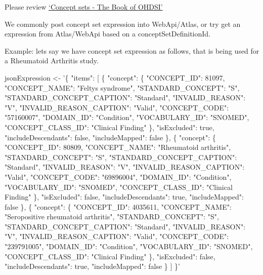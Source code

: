 \documentclass[
]{article}
\newenvironment{Shaded}{\begin{snugshade}}{\end{snugshade}}
\newcommand{\NormalTok}[1]{#1}
\newcommand{\StringTok}[1]{\textcolor[rgb]{0.31,0.60,0.02}{#1}}
\begin{document}
Please review
\href{https://ohdsi.github.io/TheBookOfOhdsi/Cohorts.html\#conceptSets}{`Concept
sets - The Book of OHDSI'}

We commonly post concept set expression into WebApi/Atlas, or try get an
expression from Atlas/WebApi based on a conceptSetDefinitionId.

Example: lets say we have concept set expression as follows, that is
being used for a Rheumatoid Arthritis study.

\begin{Shaded}
\begin{Highlighting}[]

\NormalTok{jsonExpression <-}\StringTok{ '\{}
\StringTok{  "items": [}
\StringTok{    \{}
\StringTok{      "concept": \{}
\StringTok{        "CONCEPT_ID": 81097,}
\StringTok{        "CONCEPT_NAME": "Feltys syndrome",}
\StringTok{        "STANDARD_CONCEPT": "S",}
\StringTok{        "STANDARD_CONCEPT_CAPTION": "Standard",}
\StringTok{        "INVALID_REASON": "V",}
\StringTok{        "INVALID_REASON_CAPTION": "Valid",}
\StringTok{        "CONCEPT_CODE": "57160007",}
\StringTok{        "DOMAIN_ID": "Condition",}
\StringTok{        "VOCABULARY_ID": "SNOMED",}
\StringTok{        "CONCEPT_CLASS_ID": "Clinical Finding"}
\StringTok{      \},}
\StringTok{      "isExcluded": true,}
\StringTok{      "includeDescendants": false,}
\StringTok{      "includeMapped": false}
\StringTok{    \},}
\StringTok{    \{}
\StringTok{      "concept": \{}
\StringTok{        "CONCEPT_ID": 80809,}
\StringTok{        "CONCEPT_NAME": "Rheumatoid arthritis",}
\StringTok{        "STANDARD_CONCEPT": "S",}
\StringTok{        "STANDARD_CONCEPT_CAPTION": "Standard",}
\StringTok{        "INVALID_REASON": "V",}
\StringTok{        "INVALID_REASON_CAPTION": "Valid",}
\StringTok{        "CONCEPT_CODE": "69896004",}
\StringTok{        "DOMAIN_ID": "Condition",}
\StringTok{        "VOCABULARY_ID": "SNOMED",}
\StringTok{        "CONCEPT_CLASS_ID": "Clinical Finding"}
\StringTok{      \},}
\StringTok{      "isExcluded": false,}
\StringTok{      "includeDescendants": true,}
\StringTok{      "includeMapped": false}
\StringTok{    \},}
\StringTok{    \{}
\StringTok{      "concept": \{}
\StringTok{        "CONCEPT_ID": 4035611,}
\StringTok{        "CONCEPT_NAME": "Seropositive rheumatoid arthritis",}
\StringTok{        "STANDARD_CONCEPT": "S",}
\StringTok{        "STANDARD_CONCEPT_CAPTION": "Standard",}
\StringTok{        "INVALID_REASON": "V",}
\StringTok{        "INVALID_REASON_CAPTION": "Valid",}
\StringTok{        "CONCEPT_CODE": "239791005",}
\StringTok{        "DOMAIN_ID": "Condition",}
\StringTok{        "VOCABULARY_ID": "SNOMED",}
\StringTok{        "CONCEPT_CLASS_ID": "Clinical Finding"}
\StringTok{      \},}
\StringTok{      "isExcluded": false,}
\StringTok{      "includeDescendants": true,}
\StringTok{      "includeMapped": false}
\StringTok{    \}}
\StringTok{  ]}
\StringTok{\}'}
\end{Highlighting}
\end{Shaded}
\end{document}
